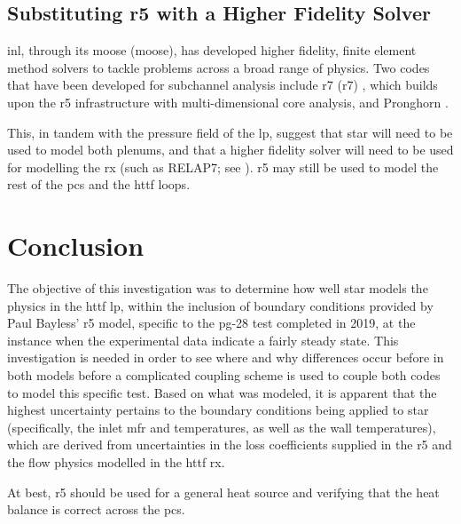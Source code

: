 \documentclass[double,12pt]{beavtex}
\begin{document}
\section{Substituting \acrshort{r5} with a Higher Fidelity Solver}

\acrshort{inl}, through its \acrlong{moose} (\acrshort{moose}), has developed higher fidelity, finite element method solvers to tackle problems across a broad range of physics. Two codes that have been developed for subchannel analysis include \acrlong{r7} (\acrshort{r7}) \cite{zhang}, which builds upon the \acrshort{r5} infrastructure with multi-dimensional core analysis, and Pronghorn \cite{balestra_2019}. 

This, in tandem with the pressure field of the \acrshort{lp}, suggest that \acrshort{star} will need to be used to model both plenums, and that a higher fidelity solver will need to be used for modelling the \acrshort{rx} (such as RELAP7; see \cite{osti_1812877}). \acrshort{r5} may still be used to model the rest of the \acrshort{pcs} and the \acrshort{httf} loops. 

\chapter{Conclusion}

The objective of this investigation was to determine how well \acrshort{star} models the physics in the \acrshort{httf} \acrshort{lp}, within the inclusion of boundary conditions provided by Paul Bayless' \acrshort{r5} model, specific to the \acrshort{pg}-28 test completed in 2019, at the instance when the experimental data indicate a fairly steady state. This investigation is needed in order to see where and why differences occur before in both models before a complicated coupling scheme is used to couple both codes to model this specific test. Based on what was modeled, it is apparent that the highest uncertainty pertains to the boundary conditions being applied to \acrshort{star} (specifically, the inlet \acrshort{mfr} and temperatures, as well as the wall temperatures), which are derived from uncertainties in the loss coefficients supplied in the \acrshort{r5} and the flow physics modelled in the \acrshort{httf} \acrshort{rx}.


At best, \acrshort{r5} should be used for a general heat source and verifying that the heat balance is correct across the \acrshort{pcs}. 

\pagebreak



\end{document}
